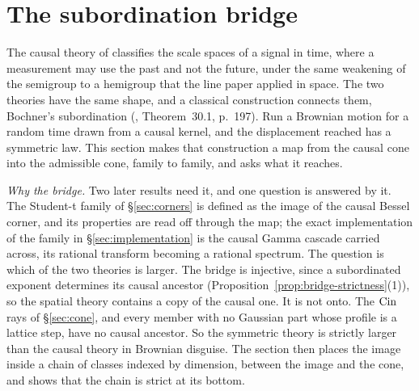 \section{The subordination bridge}\label{sec:bridge}

The causal theory of  classifies the scale spaces of a signal
in time, where a measurement may use the past and not the future, under the same weakening of
the semigroup to a hemigroup that the line paper applied in space. The two theories have the
same shape, and a classical construction connects them, Bochner's subordination
(, Theorem~30.1, p.~197).
Run a Brownian motion for a random time drawn from a causal kernel, and the displacement
reached has a symmetric law. This section makes that construction a map from the causal cone
into the admissible cone, family to family, and asks what it reaches.

\emph{Why the bridge.} Two later results need it, and one question is answered by it. The
Student-t family of \S\ref{sec:corners} is defined as the image of the causal Bessel corner,
and its properties are read off through the map; the exact implementation of the \Matern{}
family in \S\ref{sec:implementation} is the causal Gamma cascade carried across, its rational
transform becoming a rational spectrum. The question is which of the two theories is larger.
The bridge is injective, since a subordinated exponent determines its causal ancestor
(Proposition~\ref{prop:bridge-strictness}(1)), so the spatial theory contains a copy of the
causal one. It is not onto. The $\operatorname{Cin}$ rays of \S\ref{sec:cone}, and every member with no
Gaussian part whose profile is a lattice step, have no causal ancestor. So the symmetric
theory is strictly larger than the causal theory in Brownian disguise. The section then places
the image inside a chain of classes indexed by dimension, between the image and the cone, and
shows that the chain is strict at its bottom.

